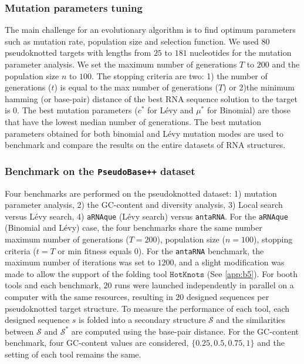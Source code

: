 \subsubsection*{Mutation parameters tuning}
The main challenge for an evolutionary algorithm is to find optimum parameters such as mutation rate, population size and selection function.
We used $80$ pseudoknotted targets with lengths from $25$ to $181$ nucleotides for the mutation parameter analysis. We set the maximum number of generations $T$ to $200$ and the population size $n$ to $100$. The stopping criteria are two: 1) the number of generations ($t$) is equal to the max number of generations ($T$) or 2)the minimum hamming (or base-pair) distance of the best \ac{RNA} sequence solution to the target is $0$. The best mutation parameters ($c^*$ for Lévy and $\mu^*$ for Binomial) are those that have the lowest median number of generations. The best mutation parameters obtained for both binomial and Lévy mutation modes are used to benchmark and compare the results on the entire datasets of \ac{RNA} structures.
\subsubsection*{Benchmark on the \texttt{PseudoBase++} dataset}
Four benchmarks are performed on the pseudoknotted dataset: 1) mutation parameter analysis, 2) the GC-content and diversity analysis, 3) Local search versus Lévy search, 4) \texttt{aRNAque} (Lévy search) versus \texttt{antaRNA}. For the \texttt{aRNAque} (Binomial and Lévy) case, the four benchmarks share the same number maximum number of generations ($T=200$), population size ($n=100$), stopping criteria ($t=T$ or min fitness equals $0$).
For the \texttt{antaRNA} benchmark, the maximum number of iterations was set to $1200$, and a slight modification was made to allow the support of the folding tool $\texttt{HotKnots}$ (See \autoref{app:b5}).  
For booth tools and each benchmark,  $20$ runs were launched independently in parallel on a computer with the same resources, resulting in $20$ designed sequences per pseudoknotted target structure. To measure the performance of each tool, each designed sequence $s$ is folded into a secondary structure $\mathcal{S}$ and the similarities between $\mathcal{S}$ and $\mathcal{S}^*$ are computed using the base-pair distance. 
For the GC-content benchmark, four GC-content values are considered, $\{0.25, 0.5, 0.75,1\}$ and the setting of each tool remains the same.
